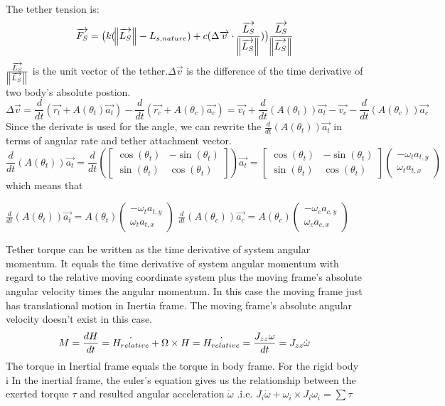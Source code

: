 The tether tension is: 
$$ \overrightarrow{F_S} = \bigl(k(\norm{\overrightarrow{L_S}} - L_{s,nature}) + c(\Delta\overrightarrow{v} \cdot 
	\frac{\overrightarrow{L_S}}{\norm{\overrightarrow{L_S}}})
	\bigr)
	\frac{\overrightarrow{L_S}}{
	\norm{
	\overrightarrow{L_S}
	}
	}
$$
$\frac{\overrightarrow{L_S}}{\norm{\overrightarrow{L_S}}}$ is the unit vector of the tether.$\Delta\overrightarrow{v}$ is the difference of the time derivative of two body's absolute postion. 
$$\Delta\overrightarrow{v} = \frac{d}{dt}(\overrightarrow{r_t}+A(\theta_t)\overrightarrow{a_t}) - \frac{d}{dt}(\overrightarrow{r_c} + A(\theta_c)\overrightarrow{a_c}) = \overrightarrow{v_t} + \frac{d}{dt}(A(\theta_t))\overrightarrow{a_t}-\overrightarrow{v_c}-\frac{d}{dt}(A(\theta_c))\overrightarrow{a_c}$$
Since the derivate is used for the angle, we can rewrite the $\frac{d}{dt}(A(\theta_t))\overrightarrow{a_t}$ in terms of angular rate and tether attachment vector.
$$\frac{d}{dt}(A(\theta_t))\overrightarrow{a_t} = \frac{d}{dt}
\left(
\begin{bmatrix}
\cos(\theta_t) & -\sin(\theta_t)\\
\sin(\theta_t) & \cos(\theta_t)
\end{bmatrix} \right)
\overrightarrow{a_t} =
\begin{bmatrix}
\cos(\theta_t) & -\sin(\theta_t)\\
\sin(\theta_t) & \cos(\theta_t)
\end{bmatrix}
\left(
\begin{array}{c}
-\omega_ta_{t,y}\\
\omega_ta_{t,x}
\end{array}\right)
$$
which means that 

$\frac{d}{dt}(A(\theta_t))\overrightarrow{a_t} = A(\theta_t)\left(
\begin{array}{c}
-\omega_ta_{t,y}\\
\omega_ta_{t,x}
\end{array}\right) $ $\frac{d}{dt}(A(\theta_c))\overrightarrow{a_c} = A(\theta_c)\left(
\begin{array}{c}
-\omega_ca_{c,y}\\
\omega_ca_{c,x}
\end{array}\right)$

Tether torque can be written as the time derivative of system angular momentum. It equals the time derivative of system angular momentum with regard to the relative moving coordinate system plus the moving frame's absolute angular velocity times the angular momentum. In this case the moving frame just has translational motion in Inertia frame. The moving frame's absolute angular velocity doesn't exist in this case. 
$$ M = \frac{dH}{dt} = \dot{H_{relative}} + \Omega \times H\\
		=\dot{H_{relative}} =\frac{J_{zz}\omega}{dt}= J_{zz}\dot{\omega}
$$
The torque in Inertial frame equals the torque in body frame.
For the rigid body i In the inertial frame, the euler's equation gives us the relationship between the exerted torque $\tau$ and resulted angular acceleration $\dot{\omega}$ .i.e. $J_i\dot{\omega} + \omega_i \times J_i\omega_i=\sum\tau$

